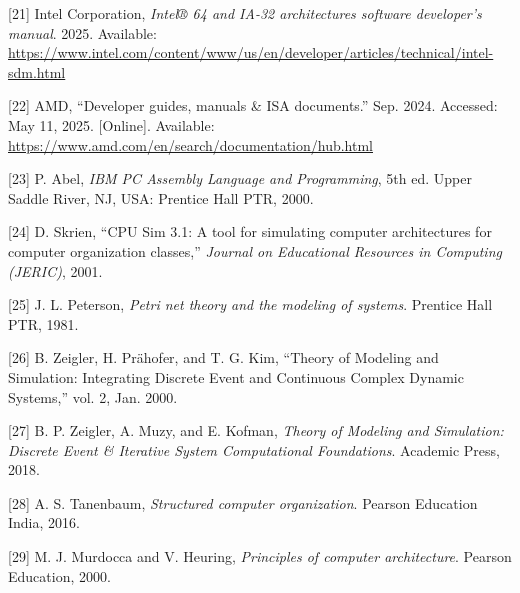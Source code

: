\documentclass[12pt,oneside]{templates/unerthesis}
\newcommand{\CSLLeftMargin}[1]{#1} %
\newcommand{\CSLRightInline}[1]{#1} %
\newlength{\cslhangindent}
\newenvironment{CSLReferences}[2] %
 {\setlength{\parindent}{0pt}%
  \setlength{\leftskip}{#1 pt\relax}%
  \setlength{\parskip}{#2 pt\relax}%
  \everypar{\setlength{\hangindent}{\cslhangindent}}}
 {\par}
\begin{document}
\begin{CSLReferences}{0}{0}
\leavevmode{}%
\CSLLeftMargin{{[}21{]} }%
\CSLRightInline{Intel Corporation, \emph{Intel® 64 and IA-32 architectures software developer's manual}. 2025. Available: \url{https://www.intel.com/content/www/us/en/developer/articles/technical/intel-sdm.html}}

\leavevmode{}%
\CSLLeftMargin{{[}22{]} }%
\CSLRightInline{AMD, {``Developer guides, manuals \& ISA documents.''} Sep. 2024. Accessed: May 11, 2025. {[}Online{]}. Available: \url{https://www.amd.com/en/search/documentation/hub.html}}

\leavevmode{}%
\CSLLeftMargin{{[}23{]} }%
\CSLRightInline{P. Abel, \emph{{IBM} {PC} {Assembly} {Language} and {Programming}}, 5th ed. Upper Saddle River, NJ, USA: Prentice Hall PTR, 2000.}

\leavevmode{}%
\CSLLeftMargin{{[}24{]} }%
\CSLRightInline{D. Skrien, {``{CPU} {Sim} 3.1: {A} tool for simulating computer architectures for computer organization classes,''} \emph{Journal on Educational Resources in Computing (JERIC)}, 2001.}

\leavevmode{}%
\CSLLeftMargin{{[}25{]} }%
\CSLRightInline{J. L. Peterson, \emph{Petri net theory and the modeling of systems}. Prentice Hall PTR, 1981.}

\leavevmode{}%
\CSLLeftMargin{{[}26{]} }%
\CSLRightInline{B. Zeigler, H. Prähofer, and T. G. Kim, {``Theory of {Modeling} and {Simulation}: {Integrating} {Discrete} {Event} and {Continuous} {Complex} {Dynamic} {Systems},''} vol. 2, Jan. 2000.}

\leavevmode{}%
\CSLLeftMargin{{[}27{]} }%
\CSLRightInline{B. P. Zeigler, A. Muzy, and E. Kofman, \emph{Theory of {Modeling} and {Simulation}: {Discrete} {Event} \& {Iterative} {System} {Computational} {Foundations}}. Academic Press, 2018.}

\leavevmode{}%
\CSLLeftMargin{{[}28{]} }%
\CSLRightInline{A. S. Tanenbaum, \emph{Structured computer organization}. Pearson Education India, 2016.}

\leavevmode{}%
\CSLLeftMargin{{[}29{]} }%
\CSLRightInline{M. J. Murdocca and V. Heuring, \emph{Principles of computer architecture}. Pearson Education, 2000.}


\end{CSLReferences}
\end{document}
